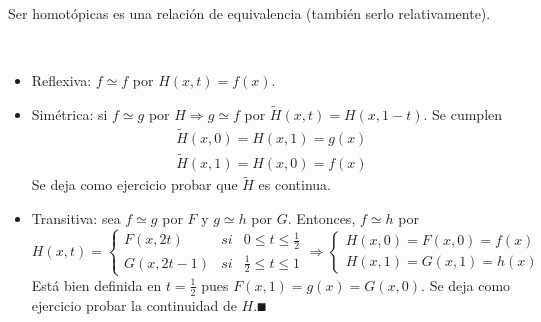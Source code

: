 \documentclass[GTS.tex]{subfiles}
\begin{document}
\begin{lemma} Ser homotópicas es una relación de equivalencia (también serlo relativamente).
\end{lemma}
\begin{dem}\
\begin{itemize}
\item Reflexiva: $f\simeq f$ por $H(x,t)=f(x)$.
\item Simétrica: si $f\simeq g$ por $H\Rightarrow g\simeq f$ por $\widetilde{H}(x,t)=H(x,1-t)$. Se cumplen
\begin{gather*}
\widetilde{H}(x,0)=H(x,1)=g(x)\\
\widetilde{H}(x,1)=H(x,0)=f(x)
\end{gather*}
Se deja como ejercicio probar que $\widetilde{H}$ es continua.
\item Transitiva: sea $f\simeq g$ por $F$ y $g\simeq h$ por $G$. Entonces, $f\simeq h$ por
\begin{equation*}
H(x,t)=\left\{\begin{array}{ccc}
F(x,2t) & si & 0\leq t\leq\frac{1}{2}\\
G(x,2t-1) & si & \frac{1}{2}\leq t\leq 1
\end{array}\right.\Longrightarrow\left\{\begin{array}{c}
H(x,0)=F(x,0)=f(x)\\
H(x,1)=G(x,1)=h(x)
\end{array}\right.
\end{equation*}
Está bien definida en $t=\frac{1}{2}$ pues $F(x,1)=g(x)=G(x,0)$. Se deja como ejercicio probar la continuidad de $H$.$\QED$
\end{itemize}
\end{dem}
\end{document}
